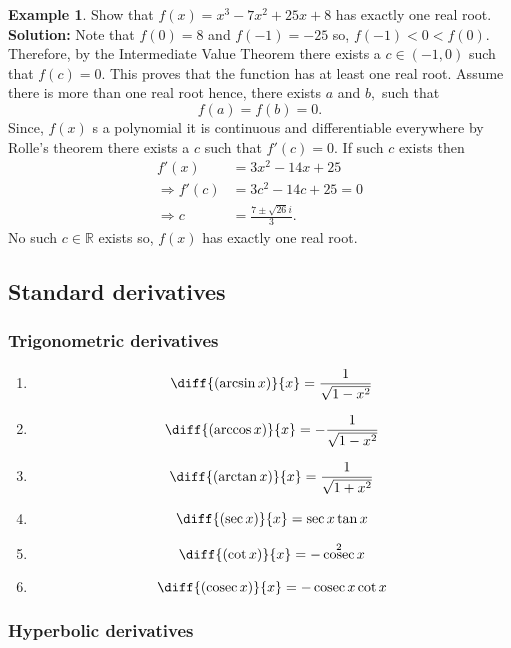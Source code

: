 \documentclass[12pt, a4paper]{article}
\newcommand{\bb}[1]{\mathbb{#1}}
\newcommand{\f}[2]{\frac{#1}{#2}}
\newcommand{\imply}{\Rightarrow}
\DeclareMathOperator{\cosec}{cosec}
\theoremstyle{definition}
\newtheorem*{example}{Example}
\theoremstyle{plain}
\begin{document}
\begin{example}
Show that $f(x)=x^3-7x^2+25x+8$ has exactly one real root. \\
\textbf{Solution:} Note that $f(0)=8$ and $f(-1)=-25$ so, $f(-1)<0<f(0).$ Therefore, by the Intermediate Value Theorem there exists a $c\in(-1,0)$ such that $f(c)=0.$ This proves that the function has at least one real root. Assume there is more than one real root hence, there exists $a$ and $b,$ such that $$f(a)=f(b)=0.$$ Since, $f(x)$ s a polynomial it is continuous and differentiable everywhere by Rolle's theorem there exists a $c$ such that $f'(c)=0.$ If such $c$ exists then $$\begin{aligned}
f'(x)&=3x^2-14x+25 \\
\imply f'(c)&=3c^2-14c+25=0 \\
\imply c&=\f{7\pm \sqrt{26}i}{3}.
\end{aligned}$$ No such $c \in \bb{R}$ exists so, $f(x)$ has exactly one real root.
\end{example}
	
\subsection{Standard derivatives}

\subsubsection{Trigonometric derivatives}

\begin{enumerate}
	
	\item $$\diff{(\arcsin{x})}{x} = \frac{1}{\sqrt{1-x^2}}$$

	\item $$\diff{(\arccos{x})}{x} = -\frac{1}{\sqrt{1-x^2}}$$

	\item $$\diff{(\arctan{x})}{x} = \frac{1}{\sqrt{1+x^2}}$$

	\item $$\diff{(\sec{x})}{x} = \sec{x}\tan{x}$$

	\item $$\diff{(\cot{x})}{x} = -\cosec^2{x}$$

	\item $$\diff{(\cosec{x})}{x} = -\cosec{x}\cot{x}$$

\end{enumerate}

\subsubsection{Hyperbolic derivatives}
\end{document}
